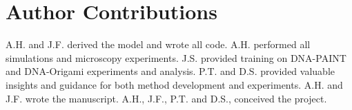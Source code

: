 \section{Author Contributions}
A.H. and J.F. derived the model and wrote all code.
%
A.H. performed all simulations and microscopy experiments. 
%
J.S. provided training on DNA-PAINT and DNA-Origami experiments and analysis.
%
P.T. and D.S. provided valuable insights and guidance for both method development and experiments.
%
A.H. and J.F. wrote the manuscript.
%
A.H., J.F., P.T. and D.S., conceived the project.